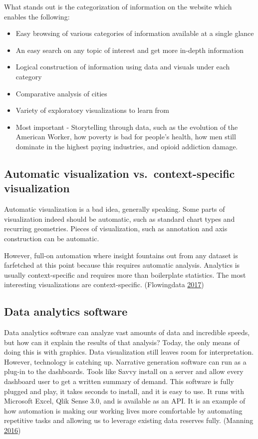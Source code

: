 \documentclass[]{book}
\providecommand{\tightlist}{%
  \setlength{\itemsep}{0pt}\setlength{\parskip}{0pt}}
\begin{document}
What stands out is the categorization of information on the website which enables the following:

\begin{itemize}
\tightlist
\item
  Easy browsing of various categories of information available at a single glance
\item
  An easy search on any topic of interest and get more in-depth information
\item
  Logical construction of information using data and visuals under each category
\item
  Comparative analysis of cities
\item
  Variety of exploratory visualizations to learn from
\item
  Most important - Storytelling through data, such as the evolution of the American Worker, how poverty is bad for people's health, how men still dominate in the highest paying industries, and opioid addiction damage.
\end{itemize}

\hypertarget{automatic-visualization-vs.context-specific-visualization}{%
\subsection{Automatic visualization vs.~context-specific visualization}\label{automatic-visualization-vs.context-specific-visualization}}

Automatic visualization is a bad idea, generally speaking. Some parts of visualization indeed should be automatic, such as standard chart types and recurring geometries. Pieces of visualization, such as annotation and axis construction can be automatic.

However, full-on automation where insight fountains out from any dataset is farfetched at this point because this requires automatic analysis. Analytics is usually context-specific and requires more than boilerplate statistics. The most interesting visualizations are context-specific. (Flowingdata \protect\hyperlink{ref-auto_viz}{2017})

\hypertarget{data-analytics-software}{%
\subsection{Data analytics software}\label{data-analytics-software}}

Data analytics software can analyze vast amounts of data and incredible speeds, but how can it explain the results of that analysis? Today, the only means of doing this is with graphics. Data visualization still leaves room for interpretation. However, technology is catching up. Narrative generation software can run as a plug-in to the dashboards. Tools like Savvy install on a server and allow every dashboard user to get a written summary of demand. This software is fully plugged and play, it takes seconds to install, and it is easy to use. It runs with Microsoft Excel, Qlik Sense 3.0, and is available as an API. It is an example of how automation is making our working lives more comfortable by automating repetitive tasks and allowing us to leverage existing data reserves fully. (Manning \protect\hyperlink{ref-work_place}{2016})
\end{document}
